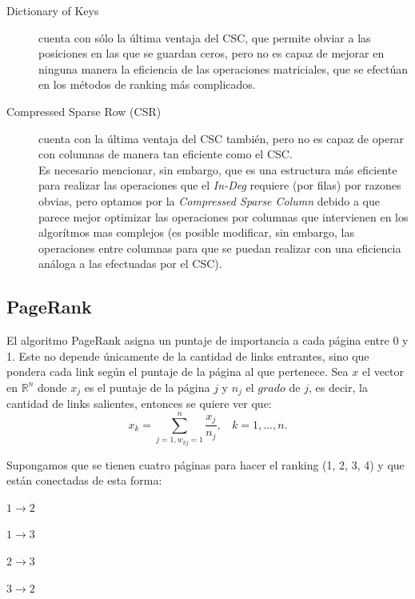 \documentclass[a4paper]{article}
\begin{document}
\begin{description}


\item[Dictionary of Keys] cuenta con s\'{o}lo la \'{u}ltima ventaja del CSC, que permite obviar a las posiciones en las que se guardan ceros, pero no es capaz de mejorar en ninguna manera la eficiencia de las operaciones matriciales, que se efect\'{u}an en los m\'{e}todos de ranking m\'{a}s complicados.

\item[Compressed Sparse Row (CSR)] cuenta con la \'{u}ltima ventaja del CSC tambi\'{e}n, pero no es capaz de operar con columnas de manera tan eficiente como el CSC.\\
Es necesario mencionar, sin embargo, que es una estructura m\'{a}s eficiente para realizar las operaciones que el \textit{In-Deg} requiere (por filas) por razones obvias, pero optamos por la \textit{Compressed Sparse Column} debido a que parece mejor optimizar las operaciones por columnas que intervienen en los algorítmos mas complejos (es posible modificar, sin embargo, las operaciones entre columnas para que se puedan realizar con una eficiencia análoga a las efectuadas por el CSC).
 
\end{description}

\newpage

\subsection{PageRank}

El algoritmo PageRank asigna un puntaje de importancia a cada página entre 0 y 1. Este no depende únicamente de la cantidad de links entrantes, sino que pondera cada link según el puntaje de la página al que pertenece. Sea $x$ el vector en $\mathbb{R}^n$ donde $x_j$ es el puntaje de la página $j$ y $n_j$ el $grado$ de $j$, es decir, la cantidad de links salientes, entonces se quiere ver que:
\begin{equation}
x_k = \sum_{j=1,w_{kj}=1}^{n} \frac{x_j}{n_j},~~~~k = 1,\dots,n.
\end{equation}

Supongamos que se tienen cuatro páginas para hacer el ranking (1, 2, 3, 4) y que están conectadas de esta forma:

$1 \rightarrow 2$

$1 \rightarrow 3$

$2 \rightarrow 3$

$3 \rightarrow 2$
\end{document}

